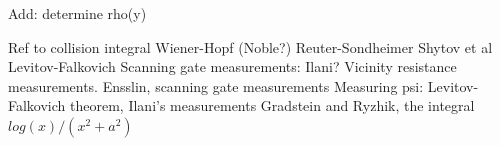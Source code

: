 \documentclass[preprint,aps,eqsecnum, prb]{revtex4-1}
\begin{document}
Add: determine rho(y)

\begin{thebibliography}{99}
 Ref to collision integral
 Wiener-Hopf (Noble?)
 Reuter-Sondheimer
 Shytov et al
 Levitov-Falkovich
 Scanning gate measurements: Ilani?
 Vicinity resistance measurements.
 Ensslin, scanning gate measurements
 Measuring psi: Levitov-Falkovich theorem,
  Ilani's measurements
 Gradstein and Ryzhik, the integral $log(x)/(x^2 + a^2)$
\end{thebibliography}
\end{document}
